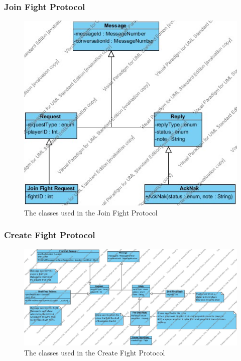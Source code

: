 \documentclass[12pt]{article}
\begin{document}
			\subsubsection{Join Fight Protocol}
				\begin{center}
					\begin{figure}[htp]
						\centering
						\includegraphics[width=.7\textwidth]{Diagrams/Class Diagrams/Join Fight Protocol.jpg}
						\caption{The classes used in the Join Fight Protocol}
					\end{figure}
				\end{center}
			\newpage
			\subsubsection{Create Fight Protocol}
				\begin{center}
					\begin{figure}[htp]
						\centering
						\includegraphics[width=\textwidth]{Diagrams/Class Diagrams/Create Fight Protocol.jpg}
						\caption{The classes used in the Create Fight Protocol}
					\end{figure}
				\end{center}
			\newpage
\end{document}
